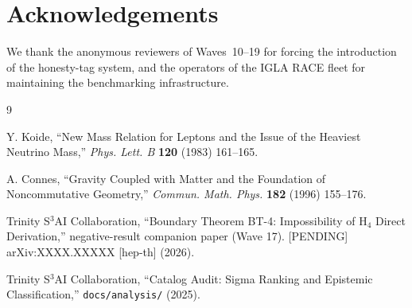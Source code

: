 \documentclass[11pt,a4paper]{article}
\begin{document}
\section*{Acknowledgements}

We thank the anonymous reviewers of Waves~10--19 for forcing the
introduction of the honesty-tag system, and the operators of the IGLA
RACE fleet for maintaining the benchmarking infrastructure.

\begin{thebibliography}{9}

Y. Koide, ``New Mass Relation for Leptons and the Issue of the
  Heaviest Neutrino Mass,''
  \textit{Phys. Lett. B} \textbf{120} (1983) 161--165.

A. Connes, ``Gravity Coupled with Matter and the Foundation of
  Noncommutative Geometry,'' \textit{Commun. Math. Phys.}
  \textbf{182} (1996) 155--176.

Trinity S$^3$AI Collaboration,
  ``Boundary Theorem BT-4: Impossibility of H$_4$ Direct Derivation,''
  negative-result companion paper (Wave 17).
  [PENDING] arXiv:XXXX.XXXXX [hep-th] (2026).

Trinity S$^3$AI Collaboration,
  ``Catalog Audit: Sigma Ranking and Epistemic Classification,''
  \texttt{docs/analysis/} (2025).

\end{thebibliography}
\end{document}
